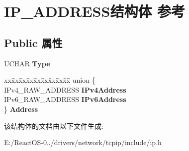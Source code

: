 \hypertarget{struct_i_p___a_d_d_r_e_s_s}{}\section{I\+P\+\_\+\+A\+D\+D\+R\+E\+S\+S结构体 参考}
\label{struct_i_p___a_d_d_r_e_s_s}
\subsection*{Public 属性}
\begin{DoxyCompactItemize}
\item 
\mbox{\label{struct_i_p___a_d_d_r_e_s_s_a44e1e86bec7f01c2116a987a876ade4f}} 
U\+C\+H\+AR {\bfseries Type}
\item 
\mbox{\label{struct_i_p___a_d_d_r_e_s_s_a8c206c88baf1d013e31e5d5ee7c99b05}} 
\begin{tabbing}
xx\=xx\=xx\=xx\=xx\=xx\=xx\=xx\=xx\=\kill
union \{\\
\>IPv4\_RAW\_ADDRESS {\bfseries IPv4Address}\\
\>IPv6\_RAW\_ADDRESS {\bfseries IPv6Address}\\
\} {\bfseries Address}\\

\end{tabbing}\end{DoxyCompactItemize}


该结构体的文档由以下文件生成\+:\begin{DoxyCompactItemize}
\item 
E\+:/\+React\+O\+S-\/0../drivers/network/tcpip/include/ip.\+h\end{DoxyCompactItemize}
